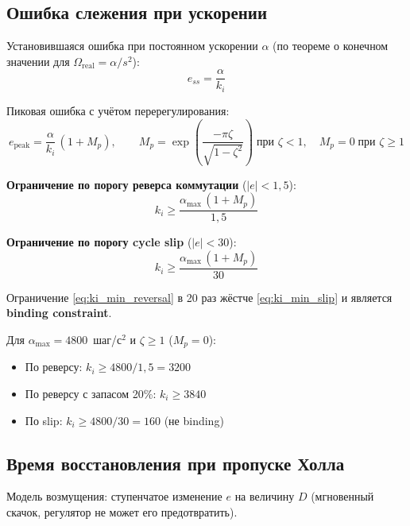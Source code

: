 \documentclass[12pt,a4paper]{article}
\begin{document}
\subsection{Ошибка слежения при ускорении}

Установившаяся ошибка при постоянном ускорении $\alpha$
(по теореме о конечном значении для $\Omega_\text{real} = \alpha/s^2$):
\begin{equation}
  \boxed{e_{ss} = \frac{\alpha}{k_i}}
  \label{eq:ess}
\end{equation}

Пиковая ошибка с учётом перерегулирования:
\begin{equation}
  e_\text{peak} = \frac{\alpha}{k_i}\,(1 + M_p),
  \qquad
  M_p = \exp\!\left(\frac{-\pi\zeta}{\sqrt{1-\zeta^2}}\right)
  \;\text{при }\zeta < 1, \quad M_p = 0 \;\text{при }\zeta \ge 1
  \label{eq:epeak}
\end{equation}

\textbf{Ограничение по порогу реверса коммутации} ($|e| < 1{,}5$):
\begin{equation}
  \boxed{k_i \ge \frac{\alpha_\text{max}\,(1 + M_p)}{1{,}5}}
  \label{eq:ki_min_reversal}
\end{equation}

\textbf{Ограничение по порогу cycle slip} ($|e| < 30$):
\begin{equation}
  k_i \ge \frac{\alpha_\text{max}\,(1 + M_p)}{30}
  \label{eq:ki_min_slip}
\end{equation}

Ограничение \eqref{eq:ki_min_reversal} в 20 раз жёстче \eqref{eq:ki_min_slip}
и является \textbf{binding constraint}.

Для $\alpha_\text{max} = 4800$~шаг/с$^2$ и $\zeta \ge 1$ ($M_p = 0$):
\begin{itemize}
  \item По реверсу: $k_i \ge 4800/1{,}5 = 3200$
  \item По реверсу с запасом 20\%: $k_i \ge 3840$
  \item По slip: $k_i \ge 4800/30 = 160$ (не binding)
\end{itemize}

\subsection{Время восстановления при пропуске Холла}

Модель возмущения: ступенчатое изменение $e$ на величину $D$
(мгновенный скачок, регулятор не может его предотвратить).
\end{document}
